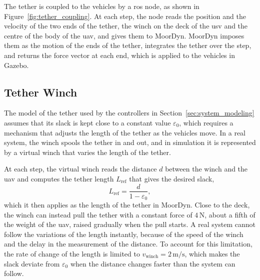The tether is coupled to the vehicles by a \gls{ros} node, as shown in Figure~\ref{fig:tether_coupling}. At each step, the node reads the position and the velocity of the two ends of the tether, the winch on the deck of the \gls{usv} and the centre of the body of the \gls{uav}, and gives them to MoorDyn. MoorDyn imposes them as the motion of the ends of the tether, integrates the tether over the step, and returns the force vector at each end, which is applied to the vehicles in Gazebo.




\subsection{Tether Winch}
\label{sec:tether_winch}

The model of the tether used by the controllers in Section~\ref{sec:system_modeling} assumes that its slack is kept close to a constant value $\varepsilon_0$, which requires a mechanism that adjusts the length of the tether as the vehicles move. In a real system, the winch spools the tether in and out, and in simulation it is represented by a virtual winch that varies the length of the tether.

At each step, the virtual winch reads the distance $d$ between the winch and the \gls{uav} and computes the tether length $L_{\text{ref}}$ that gives the desired slack,
\begin{equation}
    L_{\text{ref}} = \frac{d}{1-\varepsilon_0},
    \label{eq:winch_length}
\end{equation}
which it then applies as the length of the tether in MoorDyn. Close to the deck, the winch can instead pull the tether with a constant force of $4\,\text{N}$, about a fifth of the weight of the \gls{uav}, raised gradually when the pull starts.
A real system cannot follow the variations of the length instantly, because of the speed of the winch and the delay in the measurement of the distance. To account for this limitation, the rate of change of the length is limited to $v_{\text{winch}} = 2\,\text{m/s}$, which makes the slack deviate from $\varepsilon_0$ when the distance changes faster than the system can follow.

